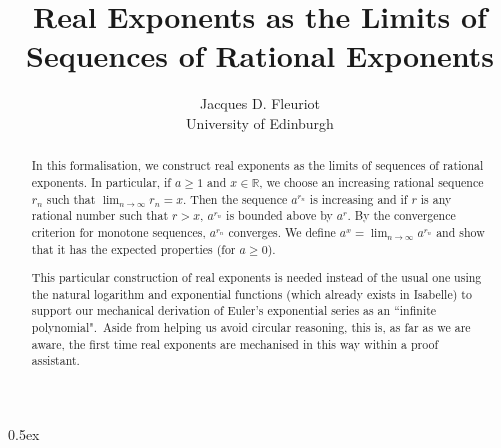 \documentclass[11pt,a4paper]{article}
\begin{document}
\title{Real Exponents as the Limits of Sequences of Rational Exponents}
\author{Jacques D. Fleuriot\\
            University of Edinburgh}
\maketitle

\begin{abstract}
In this formalisation, we  construct real exponents as the limits of sequences of rational exponents. In particular, if $a \ge 1$ and $x \in \mathbb{R}$, we choose an increasing rational sequence  $r_n$ such that $\lim_{n\to\infty} {r_n} = x$. Then the sequence $a^{r_n}$ is increasing and if $r$ is any rational number such that $r > x$, $a^{r_n}$ is bounded above by $a^r$. By the convergence criterion for monotone sequences, $a^{r_n}$ converges. We define $a^ x = \lim_{n\to\infty} a^{r_n}$ and show that it has the expected properties (for $a \ge 0$).

This particular construction of real exponents is needed instead of the usual one using the natural logarithm and exponential functions (which already exists in Isabelle) to support our mechanical derivation of Euler's exponential series as an ``infinite polynomial".\  Aside from helping us avoid circular reasoning, this is, as far as we are aware, the first time real exponents are mechanised in this way within a proof assistant.

\end{abstract}

\tableofcontents

\parindent 0pt\parskip 0.5ex



%
%
\end{document}
